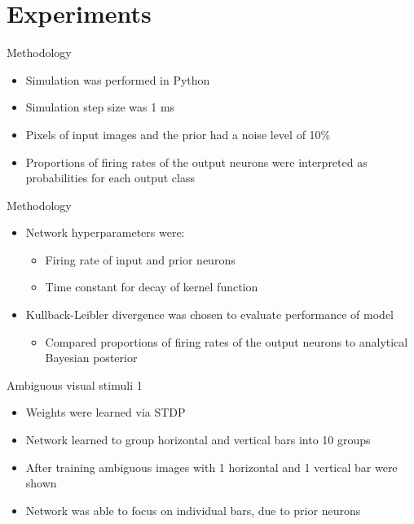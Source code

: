 \documentclass[aspectratio=169]{beamer}
\begin{document}
\section{Experiments}

\begin{frame}{Methodology}
\begin{itemize}
	\item Simulation was performed in Python
	\item Simulation step size was 1 ms
	\item Pixels of input images and the prior had a noise level of 10\%
	\item Proportions of firing rates of the output neurons were interpreted as probabilities for each output class
\end{itemize}
\end{frame}

\begin{frame}{Methodology}
\begin{itemize}
      \item Network hyperparameters were:
      \begin{itemize}
        \item Firing rate of input and prior neurons
        \item Time constant for decay of kernel function
      \end{itemize}
	\item Kullback-Leibler divergence was chosen to evaluate performance of model
	\begin{itemize}
	  \item Compared proportions of firing rates of the output neurons to analytical Bayesian posterior
	\end{itemize}
\end{itemize}
\end{frame}

\begin{frame}{Ambiguous visual stimuli 1}
  \begin{itemize}
    \item Weights were learned via STDP
    \item Network learned to group horizontal and vertical bars into 10 groups
    \item After training ambiguous images with 1 horizontal and 1 vertical bar were shown
    \item Network was able to focus on individual bars, due to prior neurons
  \end{itemize}
\end{frame}
\end{document}

